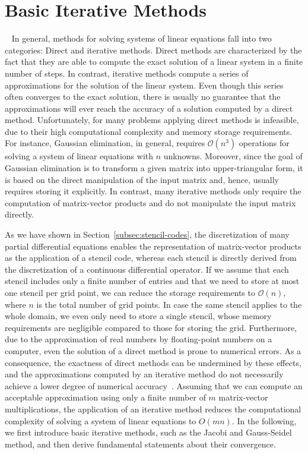 \section{Basic Iterative Methods}~\label{sec:basic-iterative-methods}
In general, methods for solving systems of linear equations fall into two categories: Direct and iterative methods.
Direct methods are characterized by the fact that they are able to compute the exact solution of a linear system in a finite number of steps.
In contrast, iterative methods compute a series of approximations for the solution of the linear system.
Even though this series often converges to the exact solution, there is usually no guarantee that the approximations will ever reach the accuracy of a solution computed by a direct method.
Unfortunately, for many problems applying direct methods is infeasible, due to their high computational complexity and memory storage requirements.
For instance, Gaussian elimination, in general, requires $\mathcal O(n^3)$ operations for solving a system of linear equations with $n$ unknowns.
Moreover, since the goal of Gaussian elimination is to transform a given matrix into upper-triangular form, it is based on the direct manipulation of the input matrix and, hence, usually requires storing it explicitly.
In contrast, many iterative methods only require the computation of matrix-vector products and do not manipulate the input matrix directly.

As we have shown in Section~\ref{subsec:stencil-codes}, the discretization of many partial differential equations enables the representation of matrix-vector products as the application of a stencil code, whereas each stencil is directly derived from the discretization of a continuous differential operator.
If we assume that each stencil includes only a finite number of entries and that we need to store at most one stencil per grid point, we can reduce the storage requirements to $\mathcal{O}(n)$, where $n$ is the total number of grid points.
In case the same stencil applies to the whole domain, we even only need to store a single stencil, whose memory requirements are negligible compared to those for storing the grid.
Furthermore, due to the approximation of real numbers by floating-point numbers on a computer, even the solution of a direct method is prone to numerical errors.
As a consequence, the exactness of direct methods can be undermined by these effects, and the approximations computed by an iterative method do not necessarily achieve a lower degree of numerical accuracy~\cite{higham2002accuracy}.
Assuming that we can compute an acceptable approximation using only a finite number of $m$ matrix-vector multiplications, the application of an iterative method reduces the computational complexity of solving a system of linear equations to $O(mn)$.
In the following, we first introduce basic iterative methods, such as the Jacobi and Gauss-Seidel method, and then derive fundamental statements about their convergence. 
